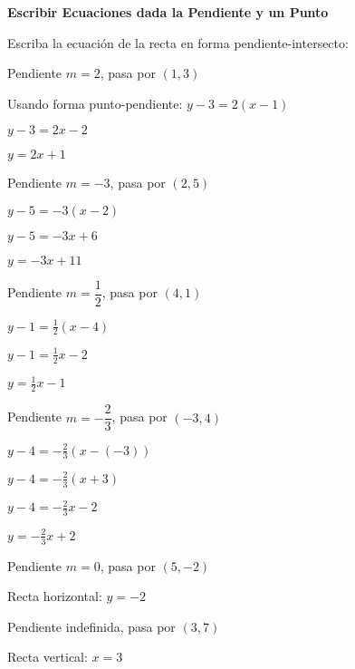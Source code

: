 \begin{exercise}
\textbf{Escribir Ecuaciones dada la Pendiente y un Punto}

Escriba la ecuación de la recta en forma pendiente-intersecto:

\problem Pendiente $m = 2$, pasa por $(1, 3)$

\begin{solucion}
Usando forma punto-pendiente: $y - 3 = 2(x - 1)$

$y - 3 = 2x - 2$

$y = 2x + 1$
\end{solucion}

\problem Pendiente $m = -3$, pasa por $(2, 5)$

\begin{solucion}
$y - 5 = -3(x - 2)$

$y - 5 = -3x + 6$

$y = -3x + 11$
\end{solucion}

\problem Pendiente $m = \dfrac{1}{2}$, pasa por $(4, 1)$

\begin{solucion}
$y - 1 = \frac{1}{2}(x - 4)$

$y - 1 = \frac{1}{2}x - 2$

$y = \frac{1}{2}x - 1$
\end{solucion}

\problem Pendiente $m = -\dfrac{2}{3}$, pasa por $(-3, 4)$

\begin{solucion}
$y - 4 = -\frac{2}{3}(x - (-3))$

$y - 4 = -\frac{2}{3}(x + 3)$

$y - 4 = -\frac{2}{3}x - 2$

$y = -\frac{2}{3}x + 2$
\end{solucion}

\problem Pendiente $m = 0$, pasa por $(5, -2)$

\begin{solucion}
Recta horizontal: $y = -2$
\end{solucion}

\problem Pendiente indefinida, pasa por $(3, 7)$

\begin{solucion}
Recta vertical: $x = 3$
\end{solucion}
\end{exercise}

